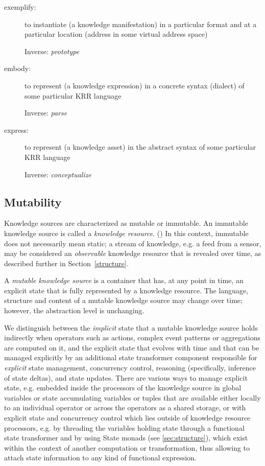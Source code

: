 \documentclass[runningheads]{llncs}
\begin{document}
\begin{description}
\item[exemplify:] to instantiate (a knowledge manifestation) in a particular format and at a particular location (address in some virtual address space)

Inverse: \emph{prototype}
\item[embody:] to represent (a knowledge expression) in a concrete syntax (dialect) of some particular KRR language

Inverse: \emph{parse}
\item[express:] to represent (a knowledge asset) in the abstract syntax of some particular KRR language

Inverse: \emph{conceptualize}
\end{description}

\subsection{Mutability}
Knowledge sources are characterized as mutable or immutable. An immutable knowledge source is called a \emph{knowledge resource}. () In this context, immutable does not necessarily mean static;  a stream of knowledge, e.g. a feed from a sensor, may be considered an \emph{observable} knowledge resource that is revealed over time, as described further in Section~\ref{structure}.

A \emph{mutable knowledge source} is a container that has, at any point in time, an explicit state that is fully represented by a knowledge resource. The language, structure and content of a mutable knowledge source may change over time; however, the abstraction level is unchanging.

We distinguish between the \textit{implicit} state that a mutable knowledge source holds indirectly when operators such as actions, complex  event patterns or aggregations are computed on it, and the explicit state that evolves with time and that can be managed explicitly by an additional state transformer component responsible for \textit{explicit} state management, concurrency control, reasoning (specifically, inference of state deltas), and state updates. 
There are various ways to manage explicit state, e.g. embedded inside the processors of the knowledge source in global variables or state accumulating variables or tuples that are available either locally to an individual operator or across the operators as a shared storage, or with explicit state and concurrency control which lies outside of knowledge resource processors, e.g. by threading the variables holding state through a functional state transformer and by using State monads (see \ref{sec:structure}), which exist within the context of another computation or transformation, thus allowing to attach state information to any kind of functional expression.
\end{document}
